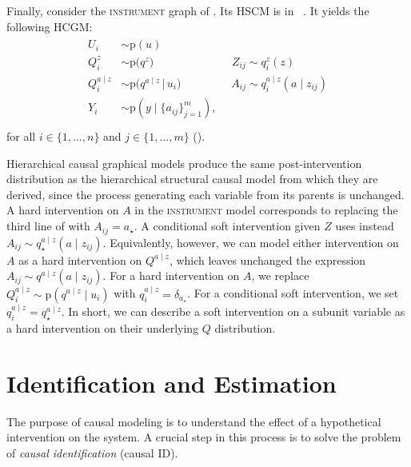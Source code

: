 \documentclass[12pt]{article}
\newcommand{\pr}{\mathrm{p}}
\begin{document}
Finally, consider the \textsc{instrument} graph of . Its HSCM is in ~. It yields the following HCGM:
\begin{align}
  \label{eqn:ex-hcgm-instrument} \begin{split}
    U_i &\sim \pr(u)\\
    Q^{z}_i &\sim \pr\big(q^{z} \big) \,\,\,\,\,\,\,\,\,\,\,\,\,\,\,\,\,\,\,\,\,\,\,\,\,\,\,\,\,\,\,\,\,\,\,\,\,\,\,\,\,\, Z_{ij} \sim q_i^{z}(z)\\
    Q^{a\mid z}_i &\sim \pr\big (q^{a\mid z}\, \big|\, u_i\big)\,\,\,\,\,\,\,\,\,\,\,\,\,\,\,\,\,\,\,\,\,\,\,\,\,\,\, A_{ij} \sim q_i^{a\mid z}(a \mid z_{ij})\\
    Y_i &\sim \pr(y \mid \{a_{ij}\}_{j=1}^m),\\
  \end{split}
\end{align}
for all $i \in \{1, \ldots, n\}$ and $j \in \{1, \ldots, m\}$ ().

Hierarchical causal graphical models produce the same post-intervention distribution as the hierarchical structural causal model from which they are derived, since the process generating each variable from its parents is unchanged.  A hard intervention on $A$ in the \textsc{instrument} model corresponds to replacing the third line of  with $A_{ij} = a_\star$.  A conditional soft intervention given $Z$ uses instead $A_{ij} \sim q_\star^{a \mid z}(a \mid z_{ij})$.
Equivalently, however, we can model either intervention on $A$ as a hard intervention on $Q^{a \mid z}$, which leaves unchanged the expression $A_{ij} \sim q^{a\mid z}(a \mid z_{ij})$. For a hard intervention on $A$, we replace $Q_i^{a \mid z} \sim \pr(q^{a \mid z} \mid u_i)$ with $q_i^{a \mid z} = \delta_{a_\star}$. For a conditional soft intervention, we set $q_i^{a \mid z} = q_\star^{a \mid z}$.
In short, we can describe a soft intervention on a subunit variable as a hard intervention on their underlying $Q$ distribution. 




 \section{Identification and Estimation}
\label{sec:identification_problem}

The purpose of causal modeling is to understand the effect of a
hypothetical intervention on the system. A crucial step in this
process is to solve the problem of \textit{causal identification}
(causal ID).
\end{document}

